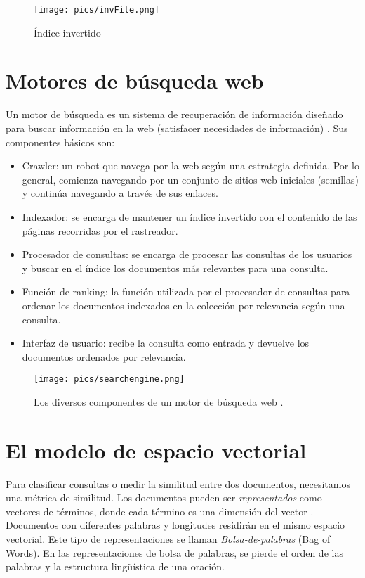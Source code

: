 \begin{figure}[h!]
\centering
\texttt{[image: pics/invFile.png]}
\caption{Índice invertido}
\end{figure}

\section{Motores de búsqueda web}

Un motor de búsqueda es un sistema de recuperación de información diseñado para buscar información en la web (satisfacer necesidades de información) \cite{manning2008}. Sus componentes básicos son:

\begin{itemize}
\item Crawler: un robot que navega por la web según una estrategia definida. Por lo general, comienza navegando por un conjunto de sitios web iniciales (semillas) y continúa navegando a través de sus enlaces.
\item Indexador: se encarga de mantener un índice invertido con el contenido de las páginas recorridas por el rastreador.
\item Procesador de consultas: se encarga de procesar las consultas de los usuarios y buscar en el índice los documentos más relevantes para una consulta.
\item Función de ranking: la función utilizada por el procesador de consultas para ordenar los documentos indexados en la colección por relevancia según una consulta.
\item Interfaz de usuario: recibe la consulta como entrada y devuelve los documentos ordenados por relevancia.
\end{itemize}

\begin{figure}[h!]
\centering
\texttt{[image: pics/searchengine.png]}
\caption{Los diversos componentes de un motor de búsqueda web \cite{manning2008}.}
\end{figure}


\section{El modelo de espacio vectorial}
Para clasificar consultas o medir la similitud entre dos documentos, necesitamos una métrica de similitud. Los documentos pueden ser \textit{representados} como vectores de términos, donde cada término es una dimensión del vector \cite{salton1975vector}. Documentos con diferentes palabras y longitudes residirán en el mismo espacio vectorial. Este tipo de representaciones se llaman \emph{Bolsa-de-palabras} (Bag of Words). En las representaciones de bolsa de palabras, se pierde el orden de las palabras y la estructura lingüística de una oración.

